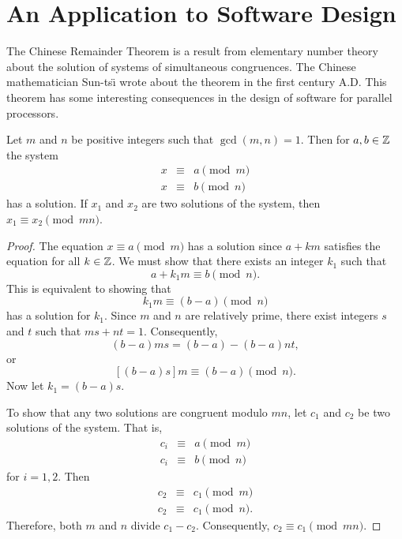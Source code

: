  
 
\section{An Application to Software Design}
 
 
The Chinese Remainder Theorem is a result from elementary number
theory about the solution of systems of simultaneous congruences. The 
Chinese mathematician Sun-ts\"{\i} wrote about the theorem in the
first century A.D\@. This theorem has some interesting
consequences in the design of software for parallel processors.
 
 
\begin{lemma}
Let $m$ and $n$ be positive integers such that $\gcd( m, n) = 1$. Then
for $a, b \in {\Bbb Z}$ the system
\begin{eqnarray*}
x & \equiv & a \pmod{m} \\
x & \equiv & b \pmod{n} 
\end{eqnarray*}
has a solution.  If $x_1$ and $x_2$ are two solutions of the system,
then  $x_1 \equiv x_2 \pmod{mn}$.
\end{lemma}
 
 
\begin{proof}
The equation $x \equiv a \pmod{m}$ has a solution since $a +km$
satisfies the equation for all $k \in {\Bbb Z}$.  We must show that
there exists an integer $k_1$ such that 
\[
a + k_1 m \equiv b \pmod{n}.
\] 
This is equivalent to showing that 
\[
k_1 m \equiv (b-a) \pmod{n}
\] 
has a solution for $k_1$.  Since $m$ and $n$ are relatively prime,
there exist integers $s$ and $t$ such that $ms + nt = 1$.
Consequently, 
\[
(b-a) ms = (b-a) -(b-a) nt,
\]
or 
\[
[(b-a)s]m \equiv (b-a) \pmod{n}. 
\]
Now let $k_1 = (b-a)s$.
 
 
To show that any two solutions are congruent modulo $mn$, let $c_1$ and
$c_2$ be two solutions of  the system. That is,
\begin{eqnarray*}
c_i & \equiv & a \pmod{m} \\
c_i & \equiv & b \pmod{n} 
\end{eqnarray*}
for $i = 1, 2$. Then
\begin{eqnarray*}
c_2 & \equiv & c_1 \pmod{m} \\
c_2 & \equiv & c_1 \pmod{n}. 
\end{eqnarray*}
Therefore, both $m$ and $n$ divide $c_1 - c_2$. Consequently,
$c_2 \equiv c_1 \pmod{mn}$.
\mbox{\hspace*{1in}}  
\end{proof}
 
